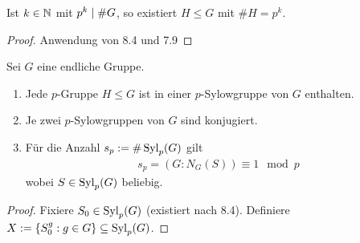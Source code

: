 \begin{kor}
	Ist $k \in \mathbb{N}$ mit $p^k \mid \# G$, so existiert $H \leq G$  mit $\# H = p^k$.
\end{kor}
\begin{proof}
	Anwendung von 8.4 und 7.9
\end{proof}

\begin{thm}
	Sei $G$ eine endliche Gruppe.
	\begin{enumerate}[label=(\roman*)]
		\item Jede $p$-Gruppe $H \leq G$ ist in einer $p$-Sylowgruppe von $G$ enthalten.
		\item Je zwei $p$-Sylowgruppen von $G$ sind konjugiert.
		\item Für die Anzahl $s_p := \# \operatorname{Syl}_p(G)$ gilt
		\begin{align*}
			s_p = (G:N_G(S)) \equiv 1 \mod p
		\end{align*}
		wobei $S \in \operatorname{Syl}_p(G)$ beliebig.
	\end{enumerate}
\end{thm}
\begin{proof}
	Fixiere $S_0 \in \operatorname{Syl}_p(G)$ (existiert nach 8.4). Definiere $X := \{ S_0^g : g \in G \} \subseteq \operatorname{Syl}_p(G)$.
\end{proof}